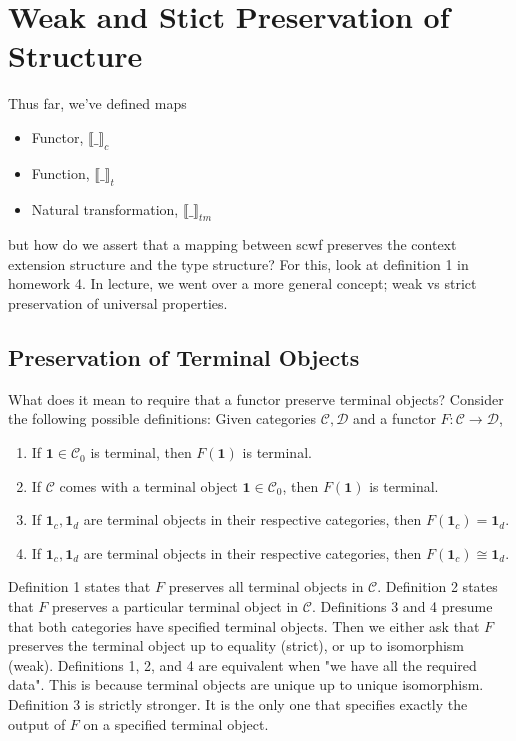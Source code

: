 \documentclass[12pt]{article}
\theoremstyle{definition}
\newcommand{\den}[1]{\llbracket #1 \rrbracket}
\newcommand{\cat}{\mathcal}
\begin{document}
\section{Weak and Stict Preservation of Structure}
Thus far, we've defined maps 
\begin{itemize}
    \item Functor, $\den{\_}_c$ 
    \item Function, $\den{\_}_t$
    \item Natural transformation, $\den{\_}_{tm}$
\end{itemize}
but how do we assert that a mapping between scwf preserves the context extension structure and the type structure? For this, look at definition 1 in homework 4. In lecture, we went over a more general concept; weak vs strict preservation of universal properties.
\subsection{Preservation of Terminal Objects}
What does it mean to require that a functor preserve terminal objects?
Consider the following possible definitions: Given categories $\cat C, \cat D$ and a functor $F : \cat C \to \cat D$,
\begin{enumerate}
    \item If $\mathbf{1} \in \cat C_0$ is terminal, then $F(\mathbf{1})$ is terminal.
    \item If $\cat C$ comes with a terminal object $\mathbf{1} \in \cat C_0$, then $F(\mathbf{1})$ is terminal.
    \item If $\mathbf{1}_c, \mathbf{1}_d$ are terminal objects in their respective categories, then $F(\mathbf{1}_c) = \mathbf{1}_d$.
    \item If $\mathbf{1}_c, \mathbf{1}_d$ are terminal objects in their respective categories, then $F(\mathbf{1}_c) \cong \mathbf{1}_d$.
\end{enumerate}
Definition 1 states that $F$ preserves all terminal objects in $\cat C$. Definition 2 states that $F$ preserves a particular terminal object in $\cat C$. Definitions 3 and 4 presume that both categories have specified terminal objects. Then we either ask that $F$ preserves the terminal object up to equality (strict), or up to isomorphism (weak). Definitions 1, 2, and 4 are equivalent when "we have all the required data". This is because terminal objects are unique up to unique isomorphism. Definition 3 is strictly stronger. It is the only one that specifies exactly the output of $F$ on a specified terminal object.
\end{document}
